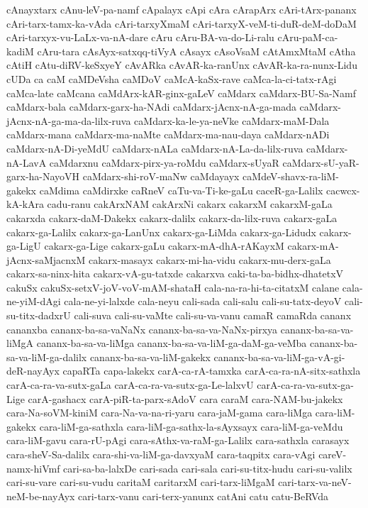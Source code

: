 {cAnayxtarx
cAnu-leV-pa-namf
cApalayx
cApi
cAra
cArapArx
cAri-tArx-pananx
cAri-tarx-tamx-ka-vAda
cAri-tarxyXmaM
cAri-tarxyX-veM-ti-duR-deM-doDaM
cAri-tarxyx-vu-LaLx-va-nA-dare
cAru
cAru-BA-va-do-Li-ralu
cAru-paM-ca-kadiM
cAru-tara
cAsAyx-satxqq-tiVyA
cAsayx
cAsoVsaM
cAtAmxMtaM
cAtha
cAtiH
cAtu-diRV-keSxyeY
cAvARka
cAvAR-ka-ranUnx
cAvAR-ka-ra-nunx-Lidu
cUDa
ca
caM
caMDeVsha
caMDoV
caMcA-kaSx-rave
caMca-la-ci-tatx-rAgi
caMca-late
caMcana
caMdArx-kAR-ginx-gaLeV
caMdarx
caMdarx-BU-Sa-Namf
caMdarx-bala
caMdarx-garx-ha-NAdi
caMdarx-jAcnx-nA-ga-mada
caMdarx-jAcnx-nA-ga-ma-da-lilx-ruva
caMdarx-ka-le-ya-neVke
caMdarx-maM-Dala
caMdarx-mana
caMdarx-ma-naMte
caMdarx-ma-nau-daya
caMdarx-nADi
caMdarx-nA-Di-yeMdU
caMdarx-nALa
caMdarx-nA-La-da-lilx-ruva
caMdarx-nA-LavA
caMdarxnu
caMdarx-pirx-ya-roMdu
caMdarx-sUyaR
caMdarx-sU-yaR-garx-ha-NayoVH
caMdarx-shi-roV-maNw
caMdayayx
caMdeV-shavx-ra-liM-gakekx
caMdima
caMdirxke
caRneV
caTu-va-Ti-ke-gaLu
caceR-ga-Lalilx
cacwcx-kA-kAra
cadu-ranu
cakArxNAM
cakArxNi
cakarx
cakarxM
cakarxM-gaLa
cakarxda
cakarx-daM-Dakekx
cakarx-dalilx
cakarx-da-lilx-ruva
cakarx-gaLa
cakarx-ga-Lalilx
cakarx-ga-LanUnx
cakarx-ga-LiMda
cakarx-ga-Lidudx
cakarx-ga-LigU
cakarx-ga-Lige
cakarx-gaLu
cakarx-mA-dhA-rAKayxM
cakarx-mA-jAcnx-saMjacnxM
cakarx-masayx
cakarx-mi-ha-vidu
cakarx-mu-derx-gaLa
cakarx-sa-ninx-hita
cakarx-vA-gu-tatxde
cakarxva
caki-ta-ba-bidhx-dhatetxV
cakuSx
cakuSx-setxV-joV-voV-mAM-shataH
cala-na-ra-hi-ta-citatxM
calane
cala-ne-yiM-dAgi
cala-ne-yi-lalxde
cala-neyu
cali-sada
cali-salu
cali-su-tatx-deyoV
cali-su-titx-dadxrU
cali-suva
cali-su-vaMte
cali-su-va-vanu
camaR
camaRda
cananx
cananxba
cananx-ba-sa-vaNaNx
cananx-ba-sa-va-NaNx-pirxya
cananx-ba-sa-va-liMgA
cananx-ba-sa-va-liMga
cananx-ba-sa-va-liM-ga-daM-ga-veMba
cananx-ba-sa-va-liM-ga-dalilx
cananx-ba-sa-va-liM-gakekx
cananx-ba-sa-va-liM-ga-vA-gi-deR-nayAyx
capaRTa
capa-lakekx
carA-ca-rA-tamxka
carA-ca-ra-nA-sitx-sathxla
carA-ca-ra-va-sutx-gaLa
carA-ca-ra-va-sutx-ga-Le-lalxvU
carA-ca-ra-va-sutx-ga-Lige
carA-gashacx
carA-piR-ta-parx-sAdoV
cara
caraM
cara-NAM-bu-jakekx
cara-Na-soVM-kiniM
cara-Na-va-na-ri-yaru
cara-jaM-gama
cara-liMga
cara-liM-gakekx
cara-liM-ga-sathxla
cara-liM-ga-sathx-la-sAyxsayx
cara-liM-ga-veMdu
cara-liM-gavu
cara-rU-pAgi
cara-sAthx-va-raM-ga-Lalilx
cara-sathxla
carasayx
cara-sheV-Sa-dalilx
cara-shi-va-liM-ga-davxyaM
cara-taqpitx
cara-vAgi
careV-namx-hiVmf
cari-sa-ba-lalxDe
cari-sada
cari-sala
cari-su-titx-hudu
cari-su-valilx
cari-su-vare
cari-su-vudu
caritaM
caritarxM
cari-tarx-liMgaM
cari-tarx-va-neV-neM-be-nayAyx
cari-tarx-vanu
cari-terx-yanunx
catAni
catu
catu-BeRVda
}
